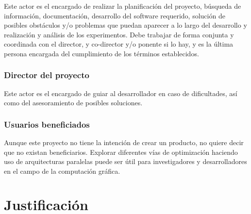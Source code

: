 \documentclass[titlepage,12pt]{report}
\begin{document}
Este actor es el encargado de realizar la planificación del proyecto, búsqueda de información, documentación, desarrollo del software requerido, solución de posibles obstáculos y/o problemas que puedan aparecer a lo largo del desarrollo y realización y análisis de los experimentos. Debe trabajar de forma conjunta y coordinada con el director, y co-director y/o ponente si lo hay, y es la última persona encargada del cumplimiento de los términos establecidos.

\subsubsection{Director del proyecto}

Este actor es el encargado de guiar al desarrollador en caso de dificultades, así como del asesoramiento de posibles soluciones.

\subsubsection{Usuarios beneficiados}

Aunque este proyecto no tiene la intención de crear un producto, no quiere decir que no existan beneficiarios. Explorar diferentes vías de optimización haciendo uso de arquitecturas paralelas puede ser útil para investigadores y desarrolladores en el campo de la computación gráfica.

\section{Justificación}
\end{document}
